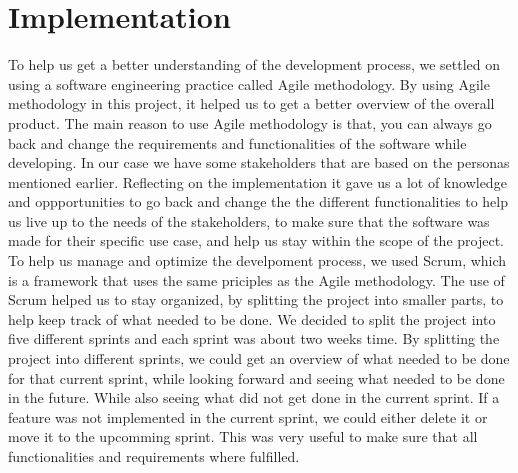 \section{Implementation}
To help us get a better understanding of the development process, we settled on using a software engineering practice called Agile methodology. By using Agile methodology in this project, it helped us to get a better overview of the overall product. The main reason to use Agile methodology is that, you can always go back and change the requirements and functionalities of the software while developing.
In our case we have some stakeholders that are based on the personas mentioned earlier. \newline
Reflecting on the implementation it gave us a lot of knowledge and oppportunities to go back and change the the different functionalities to help us live up to the needs of the stakeholders, to make sure that the software was made for their specific use case, and help us stay within the scope of the project. \newline
To help us manage and optimize the develpoment process, we used Scrum, which is a framework that uses the same priciples as the Agile methodology. The use of Scrum helped us to stay organized, by splitting the project into smaller parts, to help keep track of what needed to be done.
We decided to split the project into five different sprints and each sprint was about two weeks time. By splitting the project into different sprints, we could get an overview of what needed to be done for that current sprint, while looking forward and seeing what needed to be done in the future.
While also seeing what did not get done in the current sprint. If a feature was not implemented in the current sprint, we could either delete it or move it to the upcomming sprint. This was very useful to make sure that all functionalities and requirements where fulfilled.

